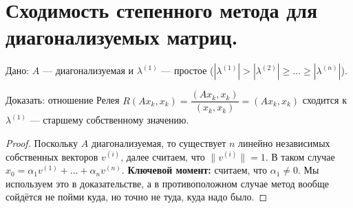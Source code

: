 \section{Сходимость степенного метода для диагонализуемых матриц.}

Дано: $A$ --- диагонализуемая и $\lambda^{(1)}$ --- простое ($|\lambda^{(1)}| >
    |\lambda^{(2)}| \geq \dots \geq |\lambda^{(n)}|$).

Доказать: отношение Релея $R(A x_k, x_k) = \dfrac{(A x_k, x_k)}{(x_k, x_k)}
    = (A x_k, x_k)$ сходится к $\lambda^{(1)}$ --- старшему собственному значению.

\begin{proof}
    Поскольку $A$ диагонализуемая, то существует $n$ линейно независимых собственных
    векторов $v^{(i)}$, далее считаем, что $\|v^{(i)}\| = 1$.
    В таком случае $x_0 = \alpha_1 v^{(1)} + \dots +
        \alpha_n v^{(n)}$. \textbf{Ключевой момент:} считаем, что $\alpha_1 \neq 0$. Мы используем
    это в доказательстве, а в противоположном случае метод вообще сойдётся не пойми
    куда, но точно не туда, куда надо было.


\end{proof}
